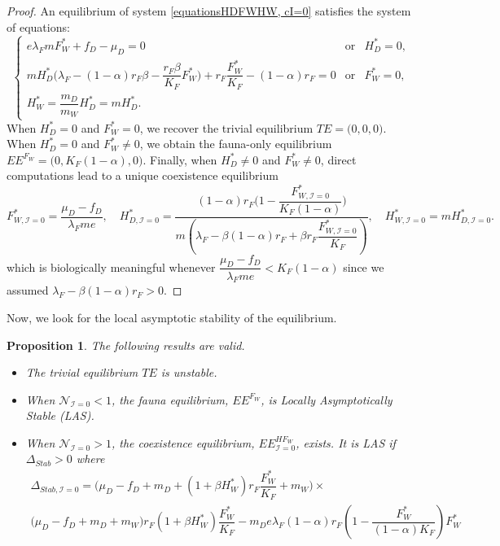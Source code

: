 \documentclass{article}
\newcommand{\lfw}{\lambda_{F}}
\newcommand{\lfw}{\lambda_{F}}
\newcommand{\cI}{\mathcal{I}}
\newtheorem{prop}{Proposition}
\begin{document}
\begin{proof}
An equilibrium of system \eqref{equationsHDFWHW, cI=0} satisfies the system of equations:
\begin{equation}\label{system-equilibre, cI=0}
\left\lbrace \begin{array}{cll}
 e \lfw m F_W^* + f_D - \mu_D = 0& \mbox{or} & H_D^* = 0,\\
m H_D^*\Big(\lfw - (1-\alpha)r_F \beta - \dfrac{r_F \beta}{K_F}F_W^* \Big) + r_F \dfrac{F_W^*}{K_F} - (1-\alpha)r_F= 0& \mbox{or} & F^*_W = 0,\\
H_W^* = \dfrac{m_D}{m_W} H_D^* = m H_D^*.&&
\end{array} \right.
\end{equation}
When $H_D^*=0$ and $F_W^*=0$, we recover the trivial equilibrium $TE = \Big(0,0,0\Big)$. When $H_D^*=0$ and $F_W^*\neq0$, we obtain the fauna-only equilibrium $EE^{F_W} = \Big(0, K_F(1-\alpha), 0 \Big)$. Finally, when $H_D^*\neq0$ and $F_W^*\neq0$, direct computations lead to a unique coexistence equilibrium 
$$F^*_{W, \cI = 0} = \dfrac{\mu_D - f_D}{\lfw m e},
\quad 
H^*_{D, \cI = 0} = \dfrac{(1-\alpha)r_F\Big(1 - \dfrac{F^*_{W, \cI = 0}}{K_F(1-\alpha)} \Big)}{m\left(\lfw - \beta (1-\alpha) r_F + \beta r_F  \dfrac{F^*_{W, \cI = 0}}{K_F}\right)} ,
\quad 
H^*_{W, \cI = 0} = m H^*_{D, \cI = 0}.$$
which is biologically meaningful whenever $\dfrac{\mu_D - f_D}{\lfw m e} < K_F(1-\alpha)$ since we assumed $\lfw - \beta (1-\alpha) r_F > 0$.
\end{proof}

Now, we look for the local asymptotic stability of the equilibrium.

\begin{prop}\label{propLAS, cI=0} The following results are valid.
\begin{itemize}
\item The trivial equilibrium $TE$ is unstable.
\item When $\mathcal{N}_{\cI = 0} < 1$, the fauna equilibrium, $EE^{F_W}$, is Locally Asymptotically Stable (LAS).
\item When $\mathcal{N}_{\cI = 0} > 1$, the coexistence equilibrium, $EE^{HF_W}_{\cI =0}$, exists. It is LAS if $\Delta_{Stab} > 0$ where 
\begin{multline*}
\Delta_{Stab, \cI =0} = \Big(\mu_D - f_D + m_D + (1+\beta H_W^*)r_F \dfrac{F_W^*}{K_F} + m_W\Big) \times \\ \big( \mu_D  -f_D + m_D + m_W \big) r_F(1+ \beta H_W^*) \dfrac{F^*_W}{K_F} - 
m_D e \lfw (1- \alpha) r_F \left(1 - \dfrac{F_W^*}{(1- \alpha)K_F}\right) F_W^*
\end{multline*}
\end{itemize}
\end{prop}
\end{document}

